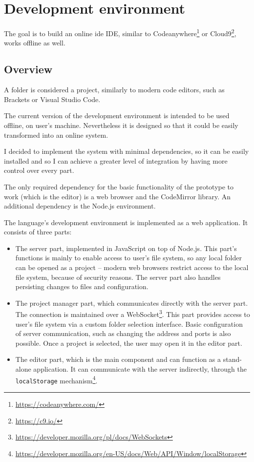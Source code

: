 \chapter{Development environment}\label{chap:editor}
The goal is to build an online \acrlong{ide} IDE, similar to
Codeanywhere\footnote{\url{https://codeanywhere.com/}} or
Cloud9\footnote{\url{https://c9.io/}}, works offline as well.

\section{Overview}
A folder is considered a project, similarly to modern code editors, such as
Brackets or Visual Studio Code.

The current version of the development environment is intended to be used
offline, on user's machine. Nevertheless it is designed so that it could be
easily transformed into an online system.

I decided to implement the system with minimal dependencies, so it can be easily
installed and so I can achieve a greater level of integration by having more
control over every part.

The only required dependency for the basic functionality of the prototype to
work (which is the editor) is a web browser and the CodeMirror library. An
additional dependency is the Node.js environment.

The language's development environment is implemented as a web application. It
consists of three parts:
\begin{itemize}
    \item The server part, implemented in JavaScript on top of Node.js. This
      part's functions is mainly to enable access to user's file system, so any
      local folder can be opened as a project -- modern web browsers restrict
      access to the local file system, because of security reasons. The server
      part also handles persisting changes to files and configuration.
    \item The project manager part, which communicates directly with the server
      part. The connection is maintained over a
      WebSocket\footnote{\url{https://developer.mozilla.org/pl/docs/WebSockets}}. This
      part provides access to user's file system via a custom folder selection
      interface. Basic configuration of server communication, such as changing
      the address and ports is also possible. Once a project is selected, the
      user may open it in the editor part.
    \item The editor part, which is the main component and can function as a
      stand-alone application. It can communicate with the server indirectly,
      through the \texttt{localStorage}
      mechanism\footnote{\url{https://developer.mozilla.org/en-US/docs/Web/API/Window/localStorage}}.
\end{itemize}


